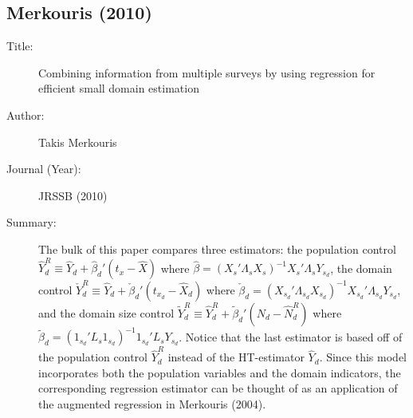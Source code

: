 \documentclass[12pt]{article}
\begin{document}
\subsection*{Merkouris (2010)}

\begin{description}
  \item[Title:] Combining information from multiple surveys by using regression
    for efficient small domain estimation

  \item[Author:] Takis Merkouris

  \item[Journal (Year):] JRSSB (2010)
  \item[Summary:] The bulk of this paper compares three estimators: the
    population control $\hat Y_d^R \equiv \hat Y_d + \hat \beta_d' (t_x - \hat
    X)$ where $\hat \beta = (X_s' \Lambda_s X_s)^{-1} X_s'\Lambda_s Y_{s_d}$,
    the domain control $\check Y_d^R \equiv \hat Y_d + \check \beta_d' (t_{x_d}
    - \hat X_d)$ where $\check \beta_d = (X_{s_d}' \Lambda_{s_d} X_{s_d})^{-1}
    X_{s_d}' \Lambda_{s_d} Y_{s_d}$, and the domain size control $\tilde Y_d^R
    \equiv \hat Y_d^R + \tilde \beta_d' (N_d - \hat N_d^R)$ where $\tilde
    \beta_d = (1_{s_d}' L_s 1_{s_d})^{-1} 1_{s_d}' L_s Y_{s_d}$. Notice that the
    last estimator is based off of the population control $\hat Y_d^R$ instead
    of the HT-estimator $\hat Y_d$. Since this model incorporates both the
    population variables and the domain indicators, the corresponding regression
    estimator can be thought of as an application of the augmented regression in 
    Merkouris (2004).

\end{description}

\end{document}
